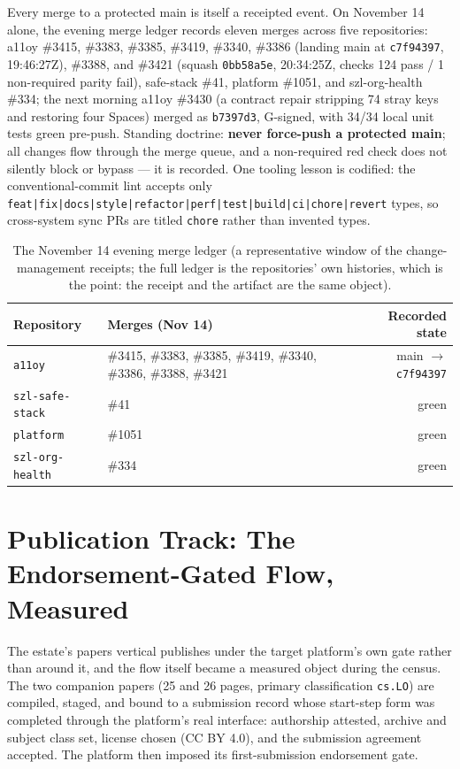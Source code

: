 ﻿\documentclass[11pt]{article}
\begin{document}
Every merge to a protected main is itself a receipted event. On November 14 alone, the evening merge ledger records eleven merges across five repositories: a11oy \#3415, \#3383, \#3385, \#3419, \#3340, \#3386 (landing main at \texttt{c7f94397}, 19:46:27Z), \#3388, and \#3421 (squash \texttt{0bb58a5e}, 20:34:25Z, checks 124 pass / 1 non-required parity fail), safe-stack \#41, platform \#1051, and szl-org-health \#334; the next morning a11oy \#3430 (a contract repair stripping 74 stray keys and restoring four Spaces) merged as \texttt{b7397d3}, G-signed, with 34/34 local unit tests green pre-push. Standing doctrine: \textbf{never force-push a protected main}; all changes flow through the merge queue, and a non-required red check does not silently block or bypass --- it is recorded. One tooling lesson is codified: the conventional-commit lint accepts only \texttt{feat|fix|docs|style|refactor|perf|test|build|ci|chore|revert} types, so cross-system sync PRs are titled \texttt{chore} rather than invented types.

\begin{table}[htbp]
\centering
\small
\begin{tabular}{llr}
\toprule
\textbf{Repository} & \textbf{Merges (Nov 14)} & \textbf{Recorded state} \\
\midrule
\texttt{a11oy} & \#3415, \#3383, \#3385, \#3419, \#3340, \#3386, \#3388, \#3421 & main $\to$ \texttt{c7f94397} \\
\texttt{szl-safe-stack} & \#41 & green \\
\texttt{platform} & \#1051 & green \\
\texttt{szl-org-health} & \#334 & green \\
\bottomrule
\end{tabular}
\caption{The November 14 evening merge ledger (a representative window of the change-management receipts; the full ledger is the repositories' own histories, which is the point: the receipt and the artifact are the same object).}
\label{tab:merges}
\end{table}

\section{Publication Track: The Endorsement-Gated Flow, Measured}
\label{sec:pubtrack}

The estate's papers vertical publishes under the target platform's own gate rather than around it, and the flow itself became a measured object during the census. The two companion papers (25 and 26 pages, primary classification \texttt{cs.LO}) are compiled, staged, and bound to a submission record whose start-step form was completed through the platform's real interface: authorship attested, archive and subject class set, license chosen (CC BY 4.0), and the submission agreement accepted. The platform then imposed its first-submission endorsement gate.
\end{document}
